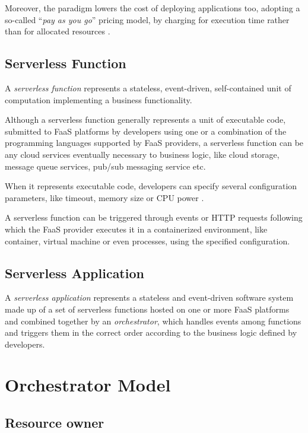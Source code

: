 Moreover, the paradigm lowers the cost of deploying applications too, adopting a so-called “\textit{pay as you go}” pricing model, by charging for execution time rather than for allocated resources \cite{COSE}.


\subsection{Serverless Function}

A \textit{serverless function} represents a stateless, event-driven, self-contained unit of computation implementing a business functionality.

Although a serverless function generally represents a unit of executable code, submitted to FaaS platforms by developers using one or a combination of the programming languages supported by FaaS providers, a serverless function can be any cloud services eventually necessary to business logic, like cloud storage, message queue services, pub/sub messaging service etc.

When it represents executable code, developers can specify several configuration parameters, like timeout, memory size or CPU power \cite{COSE}.

A serverless function can be triggered through events or HTTP requests following which the FaaS provider executes it in a containerized environment, like container, virtual machine or even processes, using the specified configuration.

\subsection{Serverless Application}

A \textit{serverless application} represents a stateless and event-driven software system made up of a set of serverless functions hosted on one or more FaaS platforms and combined together by an \textit{orchestrator}, which handles events among functions and triggers them in the correct order according to the business logic defined by developers. 

\section{Orchestrator Model}

\subsection{Resource owner}

